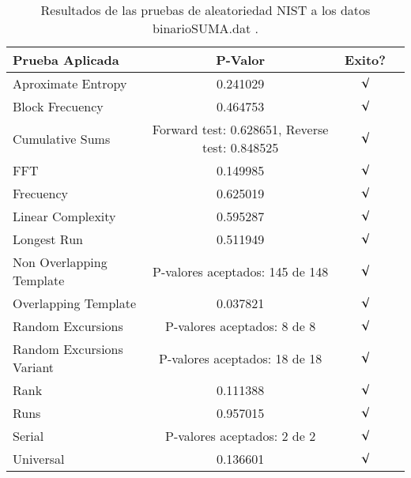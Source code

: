 \documentclass[12pt,3p]{elsarticle}
\begin{document}
\begin{table}[!h]
\caption{Resultados de las pruebas de aleatoriedad NIST a los datos binarioSUMA.dat .}
\label{sample-table}
\vskip 0.15in
\begin{center}
\begin{small}
\begin{sc}
\begin{tabular}{lccr}
\hline

Prueba Aplicada &  P-Valor & Exito? \\
\hline

Aproximate Entropy    &   0.241029  & $\surd$ \\

Block Frecuency  &  0.464753 &  $\surd$  \\

Cumulative Sums    &   Forward test:  0.628651, Reverse test: 0.848525  & $\surd$ \\

FFT    &   0.149985 &   $\surd$      \\

Frecuency     &  0.625019 &  $\surd$   \\

Linear Complexity      &  0.595287  & $\surd$ \\

Longest Run      &   0.511949  &    $\surd$      \\

Non Overlapping Template      & P-valores aceptados: 145 de 148    &     $\surd$          \\

Overlapping Template      &  0.037821  &        $\surd$       \\

Random Excursions      & P-valores aceptados: 8 de 8  &     $\surd$          \\

Random Excursions Variant & P-valores aceptados: 18 de 18  &    $\surd$        \\

Rank &    0.111388    &       $\surd$      \\

Runs &        0.957015  &     $\surd$        \\

Serial &     P-valores aceptados: 2 de 2    &     $\surd$        \\

Universal &     0.136601 &   $\surd$            \\

\hline



\end{tabular}
\end{sc}
\end{small}
\end{center}
\vskip -0.1in
\end{table}
\end{document}
